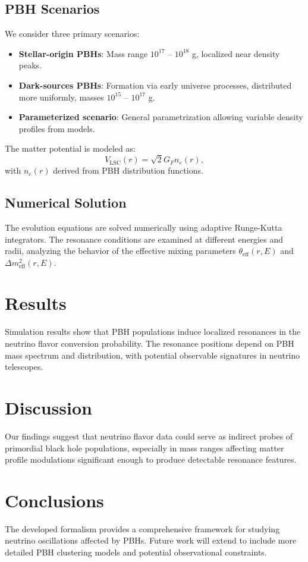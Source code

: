 \documentclass[a4paper,11pt]{article}
\begin{document}
\subsection{PBH Scenarios}
We consider three primary scenarios:
\begin{itemize}
    \item \textbf{Stellar-origin PBHs}: Mass range $10^{17}$ -- $10^{18}$ g, localized near density peaks.
    \item \textbf{Dark-sources PBHs}: Formation via early universe processes, distributed more uniformly, masses $10^{15}$ -- $10^{17}$ g.
    \item \textbf{Parameterized scenario}: General parametrization allowing variable density profiles from models.
\end{itemize}
The matter potential is modeled as:
\begin{equation}
V_\mathrm{LSC}(r) = \sqrt{2} G_F n_e(r),
\end{equation}
with $n_e(r)$ derived from PBH distribution functions.

\subsection{Numerical Solution}
The evolution equations are solved numerically using adaptive Runge-Kutta integrators. The resonance conditions are examined at different energies and radii, analyzing the behavior of the effective mixing parameters $\theta_\mathrm{eff}(r,E)$ and $\Delta m^2_\mathrm{eff}(r,E)$.

\section{Results}
Simulation results show that PBH populations induce localized resonances in the neutrino flavor conversion probability. The resonance positions depend on PBH mass spectrum and distribution, with potential observable signatures in neutrino telescopes.

\section{Discussion}
Our findings suggest that neutrino flavor data could serve as indirect probes of primordial black hole populations, especially in mass ranges affecting matter profile modulations significant enough to produce detectable resonance features.

\section{Conclusions}
The developed formalism provides a comprehensive framework for studying neutrino oscillations affected by PBHs. Future work will extend to include more detailed PBH clustering models and potential observational constraints.
\end{document}
